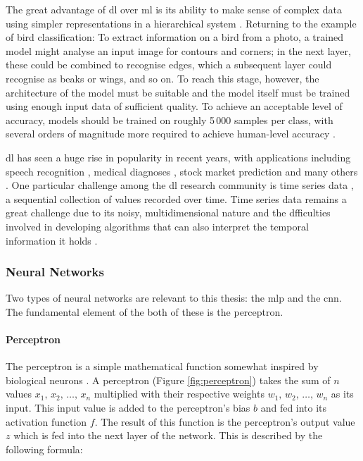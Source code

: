 The great advantage of \ac{dl} over \ac{ml} is its ability to make sense of complex data using simpler representations in a hierarchical system \cite[]{goodfellow_deep_2016}. Returning to the example of bird classification: To extract information on a bird from a photo, a trained model might analyse an input image for contours and corners; in the next layer, these could be combined to recognise edges, which a subsequent layer could recognise as beaks or wings, and so on. To reach this stage, however, the architecture of the model must be suitable and the model itself must be trained using enough input data of sufficient quality. To achieve an acceptable level of accuracy, models should be trained on roughly 5\,000 samples per class, with several orders of magnitude more required to achieve human-level accuracy \cite[p. 20]{goodfellow_deep_2016}.

\ac{dl} has seen a huge rise in popularity in recent years, with applications including speech recognition \cite[]{deng_machine_2013}, medical diagnoses \cite[]{lee_diagnosis_2018}, stock market prediction \cite[]{krollner_financial_2010} and many others \cite[]{kelleher_fundamentals_2015}. One particular challenge among the \ac{dl} research community is time series data \cite[]{yang_10_2006}, a sequential collection of values recorded over time. Time series data remains a great challenge due to its noisy, multidimensional nature \cite[]{kelleher_fundamentals_2015} and the dfficulties involved in developing algorithms that can also interpret the temporal information it holds \cite[]{bagnall_great_2017}.

\subsubsection{Neural Networks}
Two types of neural networks are relevant to this thesis: the \ac{mlp} and the \ac{cnn}. The fundamental element of the both of these is the perceptron.

\paragraph{Perceptron}
The perceptron is a simple mathematical function somewhat inspired by biological neurons \cite{rosenblatt_perceptron_1958}. A perceptron (Figure \ref{fig:perceptron}) takes the sum of \(n\) values \(x_{1},\,x_{2},\,\ldots,\,x_{n}\) multiplied with their respective weights \(w_{1},\,w_{2},\,\ldots,\,w_{n}\) as its input. This input value is added to the perceptron's bias \(b\) and fed into its activation function \(f\). The result of this function is the perceptron's output value \(z\) which is fed into the next layer of the network. This is described by the following formula:

